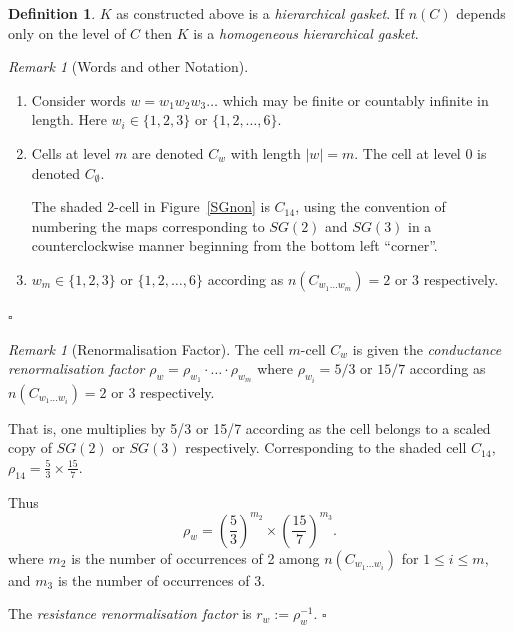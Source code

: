 \documentclass[a4paper]{amsart}
\theoremstyle{plain}
\theoremstyle{definition}
\newtheorem{definition}[theorem]{Definition}%
\theoremstyle{remark}
\newtheorem{remark}[theorem]{Remark}
\begin{document}
 \begin{definition} $ K $ as constructed above is a \emph{hierarchical gasket}.  If $ n(C) $ depends only on the level of $ C $ then 
 $ K $ is a \emph{homogeneous hierarchical gasket}.
 \end{definition}
 
 
 \begin{remark}[Words and other Notation]\mbox{}
 \begin{enumerate}
 \item Consider words $ w = w_1w_2w_3\dots $ which may be finite or countably infinite in length.  Here $ w_i \in \{1,2,3\} $ or $ \{1,2,\dots, 6\} $.
 \item  Cells at level $ m $ are denoted $ C_w $ with length $ |w| = m $.  The cell at level $ 0 $ is denoted $ C_\emptyset $.
 
 The shaded 2-cell in Figure~\ref{SGnon}   is $ C_{14} $, using the convention of numbering the maps corresponding to $ SG(2) $ and $ SG(3) $ in a counterclockwise manner beginning from the bottom left ``corner''.
 \item $ w_m \in    \{1,2,3\} $ or $ \{1,2,\dots, 6\} $ according as $n( C_{w_1\dots w_{m}}) = 2 $ or $ 3 $ respectively.  
  \end{enumerate} 
\hfill $\square$  \end{remark} 


\begin{remark}[Renormalisation Factor]  The cell $ m $-cell $ C_w $ is given the \emph{conductance renormalisation factor} 
$ \rho_w = \rho_{w_1}\cdot \ldots \cdot \rho_{w_m} $ where $ \rho_{w_i} = 5/3 $ or $ 15/7 $ according as $ n(C_{w_1\dots w_{i}})=2 $ or 3 respectively.

That is, one multiplies by 5/3 or 15/7 according as the cell belongs to a scaled copy of $ SG(2) $ or $ SG(3) $ respectively.  Corresponding to the shaded cell $ C_{14} $, $ \rho_{14} = \frac{5}{3} \times \frac{15}{7} $.

Thus 
\[
\rho_w = \left(  \frac{5}{3} \right)^{m_2} \times \left( \frac{15}{7} \right)^{m_3} .
\]
where $ m_2 $ is the number of occurrences of 2 among $ n(C_{w_1\dots w_{i}}) $ for $ 1\leq i \leq m $, and $ m_3 $ is the number of occurrences of 3.

The \emph{resistance renormalisation factor} is $ r_w := \rho_w^{-1} $.
\hfill $\square$  
\end{remark} 
\end{document}
